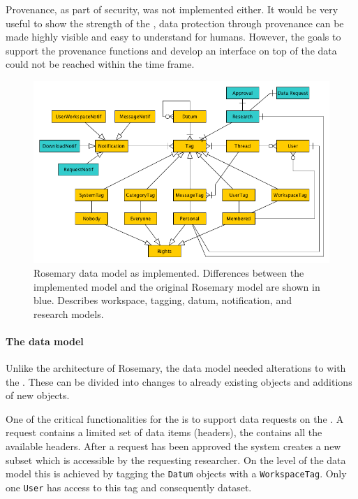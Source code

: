 Provenance, as part of security, was not implemented either.
It would be very useful to show the strength of the \ivfsystem{}, data protection through provenance can be made highly visible and easy to understand for humans.
However, the goals to support the provenance functions and develop an interface on top of the data could not be reached within the time frame.


\begin{figure}[!b]
	\centering
	\includegraphics[width=0.8\linewidth]{images/datamodel-adapted}
	\caption{
		Rosemary data model as implemented. 
		Differences between the implemented \ivfsystem{} model and the original Rosemary model are shown in blue.
		Describes workspace, tagging, datum, notification, and research models.
	}
	\label{fig:implementation-rosemary-dm}
\end{figure}



\paragraph{The data model}
Unlike the architecture of Rosemary, the data model needed alterations to  with the \ivfsystem{}.
These can be divided into changes to already existing objects and additions of new objects.

One of the critical functionalities for the \ivfsystem{} is to support data requests on the \projectdata{}.
A request contains a limited set of data items (headers), the \projectdata{} contains all the available headers.
After a request has been approved the system creates a new subset which is accessible by the requesting researcher.
On the level of the data model this is achieved by tagging the {\tt Datum} objects with a {\tt WorkspaceTag}.
Only one {\tt User} has access to this tag and consequently dataset.

